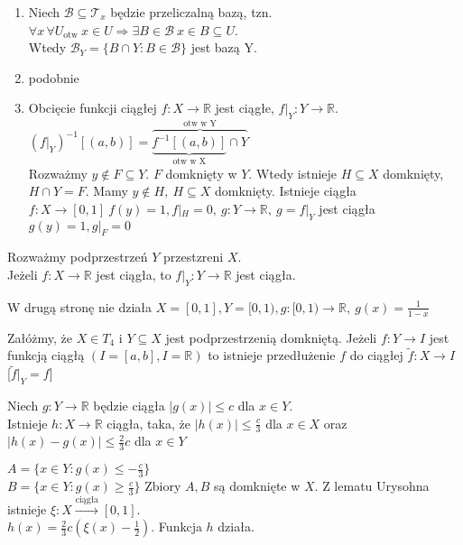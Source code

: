 \begin{dd} 
    \begin{enumerate}[(1)] \hfill
        \item Niech $\mathcal B \subseteq \mathcal T_x$ będzie przeliczalną bazą, tzn. $\forall x \, \forall U_{\text{otw}} 
        \ x \in U \Rightarrow \exists B \in \mathcal B \ x \in B \subseteq U$. \\ 
        Wtedy $\mathcal B_Y = \{ B \cap Y : B \in \mathcal B\}$ jest bazą Y. 
        \item podobnie
        \item Obcięcie funkcji ciągłej $f: X \to \mathbb R$ jest ciągłe, $f|_Y : Y \to \mathbb R$. \\ 
        $(f|_Y)^{-1} [(a,b)] = \overbrace{\underbrace{f^{-1} [(a,b)]}_{\text{otw w X}} \cap Y}^{\text{otw w Y}}$\\
        Rozważmy $y \notin F \subseteq Y$. $F$ domknięty w $Y$. Wtedy istnieje $H \subseteq X$ domknięty, 
        $H \cap Y = F$. Mamy $y \notin H,\ H \subseteq X$ domknięty. Istnieje ciągła $f: X \to [0,1] \ f(y) = 1,
        f|_H = 0, \ g: Y \to \mathbb R,\ g = f|_Y$ jest ciągła $g(y) = 1,g|_F = 0$
    \end{enumerate} 
\end{dd} 
Rozważmy podprzestrzeń $Y$ przestzreni $X$. \\ 
Jeżeli $f: X \to \mathbb R$ jest ciągła, to $f|_Y: Y \to \mathbb R$ jest ciągła.
\begin{prz}  W drugą stronę nie działa
    $X = [0,1], Y = [0,1), g: [0,1) \to \mathbb R, \ g(x) = \frac{1}{1-x}$
\end{prz} 
\begin{tw}[Tietze'go]
    Załóżmy, że $X \in T_4$ i $Y \subseteq X$ jest podprzestrzenią domkniętą. Jeżeli $f: Y \to I$ jest funkcją
    ciągłą $(I = [a,b], I = \mathbb R)$ to istnieje przedłużenie $f$ do ciągłej $\widetilde f : X \to I$
    [$\widetilde f |_Y = f$]
\end{tw} 
\begin{lem} 
    Niech $g: Y \to \mathbb R$ będzie ciągła $|g(x)| \le c$ dla $x \in Y$. \\ 
    Istnieje $h: X \to \mathbb R$ ciągła, taka, że $|h(x)| \le \frac{c}{3}$ dla $x \in X$ oraz $|h(x) - g(x)| 
    \le \frac{2}{3}c$ dla $x \in Y$
    \begin{dd} 
        $A = \{ x \in Y: g(x) \le -\frac{c}{3} \}$\\
        $B = \{ x \in Y: g(x) \ge \frac{c}{3} \}$ 
        Zbiory $A, B$ są domknięte w $X$. Z lematu Urysohna istnieje $\xi: X \xrightarrow{\text{ciągła}} [0,1]$.\\
        $h(x) = \frac{2}{3} c (\xi (x) - \frac{1}{2})$. Funkcja $h$ działa. 
    \end{dd} 
\end{lem} 
